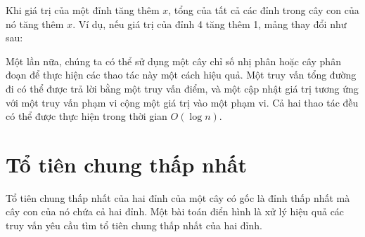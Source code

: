 Khi giá trị của một đỉnh tăng thêm $x$,
tổng của tất cả các đỉnh trong cây con của nó tăng thêm $x$.
Ví dụ, nếu giá trị của đỉnh 4 tăng thêm 1,
mảng thay đổi như sau:

\begin{center}
\end{center}

Một lần nữa, chúng ta có thể sử dụng một cây chỉ số nhị phân hoặc cây phân đoạn
để thực hiện các thao tác này một cách hiệu quả.
Một truy vấn tổng đường đi có thể được trả lời bằng một truy vấn điểm,
và một cập nhật giá trị tương ứng với một truy vấn phạm vi
cộng một giá trị vào một phạm vi.
Cả hai thao tác đều có thể được thực hiện trong thời gian $O(\log n)$.

\section{Tổ tiên chung thấp nhất}


Tổ tiên chung thấp nhất
của hai đỉnh của một cây có gốc là đỉnh thấp nhất
mà cây con của nó chứa cả hai đỉnh.
Một bài toán điển hình là xử lý hiệu quả
các truy vấn yêu cầu tìm tổ tiên chung thấp nhất
của hai đỉnh.


